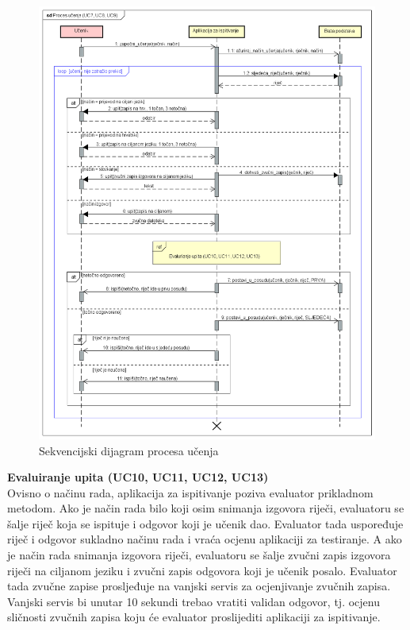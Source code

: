 					\begin{figure}[H]
						\includegraphics[width=\textwidth]{dijagrami/SD_ProcesUcenja.png} %
						\caption{Sekvencijski dijagram procesa učenja}
						\label{fig:SD_ProcesUcenja} %
					\end{figure}
				
				\textbf{Evaluiranje upita (UC10, UC11, UC12, UC13)}\\
				
					{Ovisno o načinu rada, aplikacija za ispitivanje poziva evaluator prikladnom metodom. Ako je način rada bilo koji osim snimanja izgovora riječi, evaluatoru se šalje riječ koja se ispituje i odgovor koji je učenik dao. Evaluator tada uspoređuje riječ i odgovor sukladno načinu rada i vraća ocjenu aplikaciji za testiranje. A ako je način rada snimanja izgovora riječi, evaluatoru se šalje zvučni zapis izgovora riječi na ciljanom jeziku i zvučni zapis odgovora koji je učenik posalo. Evaluator tada zvučne zapise prosljeđuje na vanjski servis za ocjenjivanje zvučnih zapisa. Vanjski servis bi unutar 10 sekundi trebao vratiti validan odgovor, tj. ocjenu sličnosti zvučnih zapisa koju će evaluator proslijediti aplikaciji za ispitivanje.}
					\eject
				
